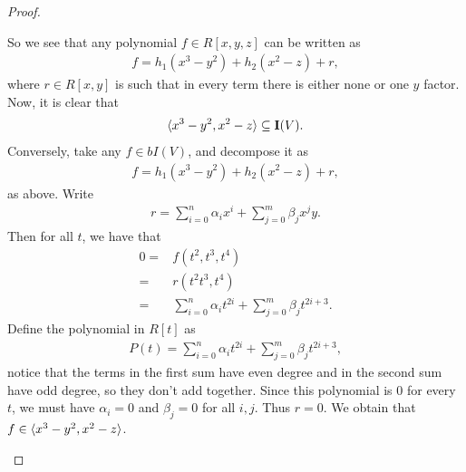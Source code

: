 \begin{proof}
\begin{enumerate}
        So we see that any polynomial $f\in R[x,y,z]$ can be written as
        \begin{align*}
            f = h_1(x^3 - y^2) + h_2(x^2 - z) + r,
        \end{align*}
        where $r\in R[x,y]$ is such that in every term there is either none or one $y$ factor. 
        Now, it is clear that
        \begin{align*}
            \langle x^3 - y^2, x^2 - z\rangle\subseteq \mathbf{I}(V).
        \end{align*}
        Conversely, take any $f\in bI(V)$, and decompose it as
         \begin{align*}
             f = h_1(x^3 - y^2) + h_2(x^2 - z) + r,
         \end{align*}
         as above. 
         Write
         \begin{align*}
             r = \sum_{i=0}^n \alpha_i x^i + \sum_{j=0}^m \beta_j x^j y.
         \end{align*}
         Then for all $t$, we have that
         \begin{align*}
             0 =& f(t^2, t^3, t^4)\\
             =& r(t^2 t^3, t^4)\\
             =& \sum_{i=0}^n \alpha_i t^{2i} + \sum_{j=0}^m \beta_j t^{2i+3}.
         \end{align*}
         Define the polynomial in $R[t]$ as
         \begin{align*}
             P(t) 
             = \sum_{i=0}^n \alpha_i t^{2i} 
             + \sum_{j=0}^m \beta_j t^{2i+3},
         \end{align*}
         notice that the terms in the first sum have even degree and in the second sum have odd degree, so they don't add together. 
         Since this polynomial is $0$ for every $t$, we must have $\alpha_i = 0$ and $\beta_j = 0$ for all $i,j$. 
         Thus $r=0$. 
         We obtain that $f\in \langle x^3 - y^2, x^2 - z\rangle$.
\end{enumerate}
\end{proof}

